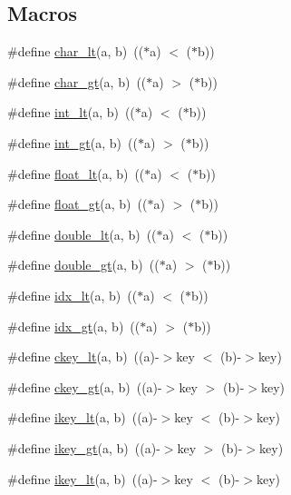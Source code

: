 \subsection*{Macros}
\begin{DoxyCompactItemize}
\item 
\#define \hyperlink{a00140_a9621b2096deac2e94ab89d73fa3904ce}{char\+\_\+lt}(a,  b)~(($\ast$a) $<$ ($\ast$b))
\item 
\#define \hyperlink{a00140_a1ea55be1c2ee6fd588668e9ac101b842}{char\+\_\+gt}(a,  b)~(($\ast$a) $>$ ($\ast$b))
\item 
\#define \hyperlink{a00140_af736e6a33cbb2a23c451f40c9a0f7654}{int\+\_\+lt}(a,  b)~(($\ast$a) $<$ ($\ast$b))
\item 
\#define \hyperlink{a00140_abee37b0c8637f6fd1ae80712c6e41357}{int\+\_\+gt}(a,  b)~(($\ast$a) $>$ ($\ast$b))
\item 
\#define \hyperlink{a00140_aa5e1ffbeea4ce3d5c0029c0388e17e42}{float\+\_\+lt}(a,  b)~(($\ast$a) $<$ ($\ast$b))
\item 
\#define \hyperlink{a00140_a0430c14a975f635bf512a8bbbe3e88f4}{float\+\_\+gt}(a,  b)~(($\ast$a) $>$ ($\ast$b))
\item 
\#define \hyperlink{a00140_a34f21ba41adcb19c97ea184e6f3b63a6}{double\+\_\+lt}(a,  b)~(($\ast$a) $<$ ($\ast$b))
\item 
\#define \hyperlink{a00140_a39cd6944850415c93f09e87790a9256b}{double\+\_\+gt}(a,  b)~(($\ast$a) $>$ ($\ast$b))
\item 
\#define \hyperlink{a00140_a978285df780c1e9d547c6f1a6353c50d}{idx\+\_\+lt}(a,  b)~(($\ast$a) $<$ ($\ast$b))
\item 
\#define \hyperlink{a00140_ac084b3e069fd8d98b8f68e2376c33770}{idx\+\_\+gt}(a,  b)~(($\ast$a) $>$ ($\ast$b))
\item 
\#define \hyperlink{a00140_a649b7b4a837507141d9fa38277fa6cb3}{ckey\+\_\+lt}(a,  b)~((a)-\/$>$key $<$ (b)-\/$>$key)
\item 
\#define \hyperlink{a00140_a75ba6da738276df4e901fd2db157b1b2}{ckey\+\_\+gt}(a,  b)~((a)-\/$>$key $>$ (b)-\/$>$key)
\item 
\#define \hyperlink{a00140_ae2275beb4f8212a5a1b8299bd57f0595}{ikey\+\_\+lt}(a,  b)~((a)-\/$>$key $<$ (b)-\/$>$key)
\item 
\#define \hyperlink{a00140_af802b818526cc3a70c669f0b3115aa7f}{ikey\+\_\+gt}(a,  b)~((a)-\/$>$key $>$ (b)-\/$>$key)
\item 
\#define \hyperlink{a00140_ae2275beb4f8212a5a1b8299bd57f0595}{ikey\+\_\+lt}(a,  b)~((a)-\/$>$key $<$ (b)-\/$>$key)

\end{DoxyCompactItemize}
